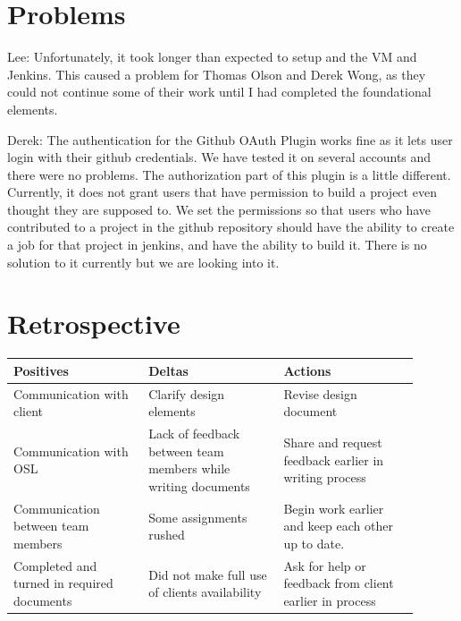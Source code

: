 \documentclass[10pt,onecolumn,journal,draftclsnofoot]{IEEEtran}
\begin{document}
\section{Problems}
Lee:
Unfortunately, it took longer than expected to setup and the VM and Jenkins.
This caused a problem for Thomas Olson and Derek Wong, as they could not continue some of their work until I had completed the foundational elements.

Derek:
The authentication for the Github OAuth Plugin works fine as it lets user login with their github credentials. We have tested it on several accounts and there were no problems. The authorization part of this plugin is a little different. Currently, it does not grant users that have permission to build a project even thought they are supposed to. We set the permissions so that users who have contributed to a project in the github repository should have the ability to create a job for that project in jenkins, and have the ability to build it. There is no solution to it currently but we are looking into it.

\section{Retrospective}
\begin{center}
	\begin{tabular}{| p{0.3\linewidth} | p{0.3\linewidth} | p{0.3\linewidth} |}\hline
		Positives & Deltas & Actions \\ \hline
		Communication with client & Clarify design elements 	& Revise design document \\ \hline
		Communication with OSL & Lack of feedback between team members while writing documents & Share and request feedback earlier in writing process \\ \hline
		Communication between team members	& Some assignments rushed & Begin work earlier and keep each other up to date. \\ \hline
		Completed and turned in required documents & Did not make full use of clients availability & Ask for help or feedback from client earlier in process \\ \hline
	\end{tabular}
\end{center}
\end{document}
